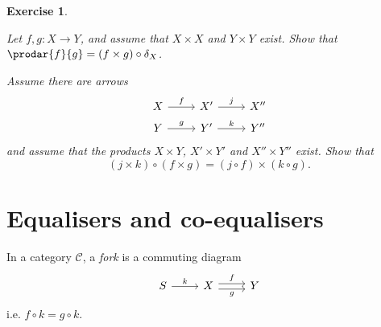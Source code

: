 \documentclass[article, a4paper, 11pt, oneside]{memoir}
\numberwithin{equation}{chapter}
\newcommand{\cat}[1]{\mathcal{#1}}
\newcommand{\catC}{\cat{C}}
\theoremstyle{myexample}
\theoremstyle{myexamplebreak}
\newtheorem{exercisebreak}[theorem]{Exercise}
\begin{document}
\begin{exercisebreak}
    \begin{enumexercise}
        \item Let $f,g \colon X \to Y$, and assume that $X \times X$ and $Y \times Y$ exist. Show that $\prodar{f}{g} = (f \times g) \circ \delta_X$.
        
        \item Assume there are arrows
        \begin{equation*}
            \begin{tikzcd}[row sep=tiny]
                X
                    \ar[r, "f"]
                & X'
                    \ar[r, "j"]
                & X''
                \\
                Y
                    \ar[r, "g"]
                & Y'
                    \ar[r, "k"]
                & Y''
            \end{tikzcd}
        \end{equation*}
        and assume that the products $X \times Y$, $X' \times Y'$ and $X'' \times Y''$ exist. Show that
        \begin{equation*}
            (j \times k) \circ (f \times g)
                = (j \circ f) \times (k \circ g).
        \end{equation*}
    \end{enumexercise}
\end{exercisebreak}




\chapter{Equalisers and co-equalisers}

In a category $\catC$, a \emph{fork} is a commuting diagram
%
\begin{equation*}
    \begin{tikzcd}
        S
            \ar[r, "k"]
        & X
            \ar[r, "f", shift left]
            \ar[r, "g", shift right, swap]
        & Y
    \end{tikzcd}
\end{equation*}
%
i.e. $f \circ k = g \circ k$.
\end{document}
